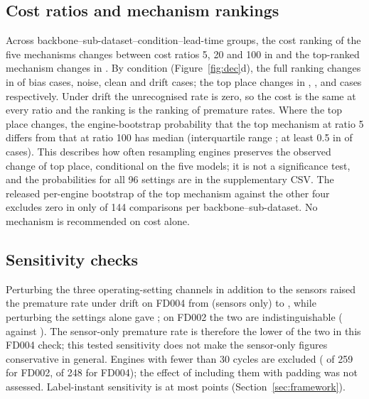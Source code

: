 \subsection{Cost ratios and mechanism rankings}\label{sec:cost}
Across \JRevGroups{} backbone--sub-dataset--condition--lead-time groups, the cost ranking of the five mechanisms changes between cost ratios 5, 20 and 100 in \JRevTotal{} and the top-ranked mechanism changes in \JTopTotal. By condition (Figure~\ref{fig:dec}d), the full ranking changes in \JRevBias{} of \JNBias{} bias cases, \JRevNoise{} noise, \JRevClean{} clean and \JRevDrift{} drift cases; the top place changes in \JTopBias, \JTopNoise, \JTopClean{} and \JTopDrift{} cases respectively. Under drift the unrecognised rate is zero, so the cost is the same at every ratio and the ranking is the ranking of premature rates. Where the top place changes, the engine-bootstrap probability that the top mechanism at ratio 5 differs from that at ratio 100 has median \JTopBootMed{} (interquartile range \JTopBootIQR; at least 0.5 in \JTopBootGeFive of \JTopBootN{} cases). This describes how often resampling engines preserves the observed change of top place, conditional on the five models; it is not a significance test, and the probabilities for all 96 settings are in the supplementary CSV. The released per-engine bootstrap of the top mechanism against the other four excludes zero in only \NBootSig{} of 144 comparisons per backbone--sub-dataset. No mechanism is recommended on cost alone.

\subsection{Sensitivity checks}\label{sec:sens}
Perturbing the three operating-setting channels in addition to the sensors raised the premature rate under drift on FD004 from \NAOneFDfourSens{} (sensors only) to \NAOneFDfourJoint, while perturbing the settings alone gave \NAOneFDfourSet{}; on FD002 the two are indistinguishable (\NAOneFDtwoSens{} against \NAOneFDtwoJoint). The sensor-only premature rate is therefore the lower of the two in this FD004 check; this tested sensitivity does not make the sensor-only figures conservative in general. Engines with fewer than 30 cycles are excluded (\JExclTwo{} of 259 for FD002, \JExclFour{} of 248 for FD004); the effect of including them with padding was not assessed. Label-instant sensitivity is at most \JLabelHeadline{} points (Section~\ref{sec:framework}).
